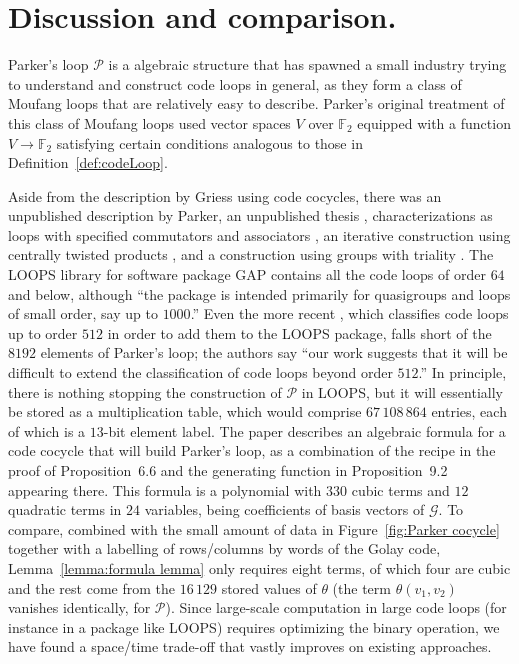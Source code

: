 \documentclass{article}
\theoremstyle{plain}
\theoremstyle{definition}
\def \cG {\mathcal{G}}
\def \cP {\mathcal{P}}
\def \FF {\mathbb{F}}
\begin{document}
\section{Discussion and comparison.}\label{sec:discussion}

Parker's loop $\cP$ is a algebraic structure that has spawned a small industry trying to understand and construct code loops in general, as they form a class of Moufang loops that are relatively easy to describe.
Parker's original treatment of this class of Moufang loops used vector spaces $V$ over $\FF_2$ equipped with a function $V \to \FF_2$ satisfying certain conditions analogous to those in Definition~\ref{def:codeLoop}.

Aside from the description by Griess using code cocycles, there was an unpublished description by Parker, an unpublished thesis \cite{Johnson}, characterizations as loops with specified commutators and associators \cite{CheinGoodaire}, an iterative construction using centrally twisted products \cite{Hsu}, and a construction using groups with triality \cite{Nagy}. 
The LOOPS library \cite{LOOPS} for software package GAP \cite{GAP4} contains all the code loops of order $64$ and below, although ``the package is intended primarily for quasigroups and loops of small order, say up to $1000$.''
Even the more recent \cite{OBrien_Vojtechovsky}, which classifies code loops up to order $512$ in order to add them to the LOOPS package, falls short of the $8192$ elements of Parker's loop; the authors say ``our work suggests that it will be difficult to extend the classification of code loops beyond order $512$.''
In principle, there is nothing stopping the construction of $\cP$ in LOOPS, but it will essentially be stored as a multiplication table, which would comprise $67\,108\,864$ entries, each of which is a $13$-bit element label.
The paper \cite{Morier-Genoud_Ovsienko} describes an algebraic formula for a code cocycle that will build Parker's loop, as a combination of the recipe in the proof of Proposition~6.6 and the generating function in Proposition~9.2 appearing there.
This formula is a polynomial with $330$ cubic terms and $12$ quadratic terms in $24$ variables, being coefficients of basis vectors of $\cG$. 
To compare, combined with the small amount of data in Figure~\ref{fig:Parker cocycle} together with a labelling of rows/columns by words of the Golay code, Lemma~\ref{lemma:formula lemma} only requires eight terms, of which four are cubic and the rest come from the $16\,129$ stored values of $\theta$ (the term $\theta(v_1,v_2)$ vanishes identically, for $\cP$).
Since large-scale computation in large code loops (for instance in a package like LOOPS) requires optimizing the binary operation, we have found a space/time trade-off that vastly improves on existing approaches.
\end{document}

